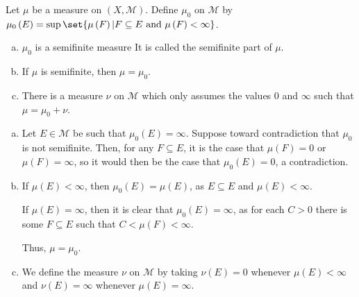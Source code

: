 \documentclass[10pt]{mypackage}
\begin{document}
\begin{exercise}[Exercise 15]
  Let $\mu$ be a measure on $\left(X,\mathcal{M}\right)$. Define $\mu_0$ on $\mathcal{M}$ by $\mu_0\left(E\right) = \sup\set{\mu\left(F\right) | F\subseteq E\text{ and }\mu\left(F\right) < \infty}$.
  \begin{enumerate}[(a)]
    \item $\mu_0$ is a semifinite measure It is called the semifinite part of $\mu$.
    \item If $\mu$ is semifinite, then $\mu = \mu_0$.
    \item There is a measure $\nu$ on $\mathcal{M}$ which only assumes the values $0$ and $\infty$ such that $\mu = \mu_0 + \nu$.
  \end{enumerate}
\end{exercise}
\begin{solution}\hfill
  \begin{enumerate}[(a)]
    \item Let $E\in \mathcal{M}$ be such that $\mu_0\left(E\right) = \infty$. Suppose toward contradiction that $\mu_0$ is not semifinite. Then, for any $F\subseteq E$, it is the case that $\mu\left(F\right) = 0$ or $\mu\left(F\right) = \infty$, so it would then be the case that $\mu_0\left(E\right) = 0$, a contradiction.
    \item If $\mu\left(E\right) < \infty$, then $\mu_0\left(E\right) = \mu\left(E\right)$, as $E \subseteq E$ and $\mu\left(E\right) < \infty$.\newline

      If $\mu\left(E\right) = \infty$, then it is clear that $\mu_0\left(E\right) = \infty$, as for each $C > 0$ there is some $F\subseteq E$ such that $C < \mu\left(F\right) < \infty$.\newline

      Thus, $\mu = \mu_0$.
    \item We define the measure $\nu$ on $\mathcal{M}$ by taking $\nu(E) = 0$ whenever $\mu\left(E\right) < \infty$ and $\nu(E) = \infty$ whenever $\mu(E) = \infty$.
  \end{enumerate}
\end{solution}
\end{document}
